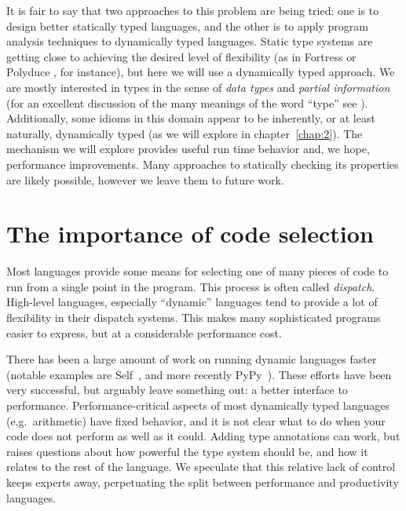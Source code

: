 It is fair to say that two approaches to this problem are being tried: one is
to design better statically typed languages, and the other is to apply
program analysis techniques to dynamically typed languages.
Static type systems are getting close to achieving the desired level
of flexibility (as in Fortress \cite{fortresspec} or Polyduce \cite{polyduce1},
for instance),
but here we will use a dynamically typed approach.
We are mostly interested in types in the sense of \emph{data types} and
\emph{partial information}
(for an excellent discussion of the many meanings of the word ``type''
see \cite{Kell2014}).
Additionally, some idioms in this domain appear to be inherently, or at least
naturally, dynamically typed (as we will explore in chapter~\ref{chap:2}).
The mechanism we will explore provides useful run time behavior and, we hope,
performance improvements.
Many approaches to statically checking its properties are likely possible,
however we leave them to future work.



\section{The importance of code selection}

Most languages provide some means for selecting one of many pieces of code
to run from a single point in the program.
This process is often called \emph{dispatch}.
High-level languages, especially ``dynamic'' languages tend to provide a
lot of flexibility in their dispatch systems.
This makes many sophisticated programs easier to express, but at a considerable
performance cost.

There has been a large amount of work on running dynamic languages faster
(notable examples are Self~\cite{selflang}, and more recently PyPy~\cite{pypyjit}).
These efforts have been very successful, but arguably leave something
out: a better interface to performance.
Performance-critical aspects of most dynamically typed languages (e.g.\ arithmetic)
have fixed behavior, and it is not clear what to do when your code does not
perform as well as it could.
Adding type annotations can work, but raises questions about how powerful
the type system should be, and how it relates to the rest of the language.
We speculate that this relative lack of control keeps experts away,
perpetuating the split between performance and productivity languages.


